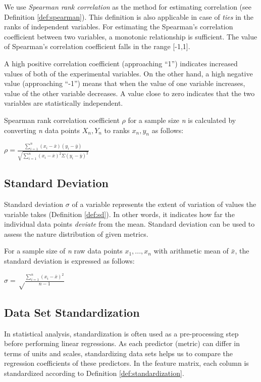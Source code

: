 We use \textit{Spearman rank correlation} as the method for estimating correlation (see Definition \ref{def:spearman}). This definition is also applicable in case of \textit{ties} in the ranks of independent variables. For estimating the Spearman's correlation coefficient between two variables, a monotonic relationship is sufficient. The value of Spearman's correlation coefficient falls in the range [-1,1].

A high positive correlation coefficient (approaching ``1'') indicates increased values of both of the experimental variables. On the other hand, a high negative value (approaching ``-1'') means that when the value of one variable increases, value of the other variable decreases. A value close to zero indicates that the two variables are statistically independent. 
\theoremstyle{definition}
\begin{definition}{Spearman rank correlation coefficient $\rho$ for a sample size \textit{n} is calculated by converting \textit{n} data points \textit{$X_n,Y_n$} to ranks \textit{$x_n,y_n$} as follows:}

\begin{center}\Large
$\rho = \frac{\sum\limits_{i=1}^{n}(x_i - \bar{x})(y_i - \bar{y})}{\sqrt{\sum\limits_{i=1}^{n}(x_i - \bar{x})^2\Sigma(y_i - \bar{y})^2}}$
\end{center}
\label{def:spearman}
\end{definition}

\subsection{Standard Deviation}
Standard deviation $\sigma$ of a variable represents the extent of variation of values the variable takes (Definition \ref{def:sd}). In other words, it indicates how far the individual data points \textit{deviate} from the mean. Standard deviation can be used to assess the nature distribution of given metrics. 
\theoremstyle{definition}
\begin{definition}{For a sample size of \textit{n} raw data points \textit{$x_1,...,x_n$} with arithmetic mean of $\bar{x}$, the standard deviation is expressed as follows:  }
\begin{center}\Large
$\sigma = \sqrt\frac{\sum\limits_{i=1}^{n}(x_i - \bar{x})^2} {n - 1}$
\label{def:sd}
\end{center}
\end{definition}

\subsection{Data Set Standardization}
\label{datasetstandardization}
In statistical analysis, standardization is often used as a pre-processing step before performing linear regressions. As each predictor (metric) can differ in terms of units and scales, standardizing data sets helps us to compare the regression coefficients of these predictors. In the feature matrix, each column is standardized according to Definition \ref{def:standardization}.

